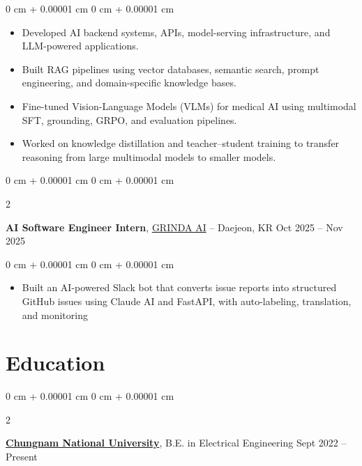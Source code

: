 \documentclass[10pt, letterpaper]{article}
\newenvironment{highlights}{
    \begin{itemize}[
        topsep=0.10 cm,
        parsep=0.10 cm,
        partopsep=0pt,
        itemsep=0pt,
        leftmargin=0 cm + 10pt
    ]
}{
    \end{itemize}
} %
\newenvironment{onecolentry}{
    \begin{adjustwidth}{
        0 cm + 0.00001 cm
    }{
        0 cm + 0.00001 cm
    }
}{
    \end{adjustwidth}
} %
\newenvironment{twocolentry}[2][]{
    \onecolentry
    \def\secondColumn{#2}
    \setcolumnwidth{\fill, 4.5 cm}
    \begin{paracol}{2}
}{
    \switchcolumn \raggedleft \secondColumn
    \end{paracol}
    \endonecolentry
} %
\begin{document}
        \vspace{0.10 cm}
        \begin{onecolentry}
            \begin{highlights}
                \item Developed AI backend systems, APIs, model-serving infrastructure, and LLM-powered applications.
                \item Built RAG pipelines using vector databases, semantic search, prompt engineering, and domain-specific knowledge bases.
                \item Fine-tuned Vision-Language Models (VLMs) for medical AI using multimodal SFT, grounding, GRPO, and evaluation pipelines.
                \item Worked on knowledge distillation and teacher--student training to transfer reasoning from large multimodal models to smaller models.
            \end{highlights}
        \end{onecolentry}
        \vspace{0.20 cm}
        \begin{twocolentry}{
            Oct 2025 – Nov 2025
        }
            \textbf{AI Software Engineer Intern}, \href{https://www.grinda.ai/en}{\textcolor{linkBlue}{GRINDA AI}} -- Daejeon, KR\end{twocolentry}

        \vspace{0.10 cm}
        \begin{onecolentry}
            \begin{highlights}
                \item Built an AI-powered Slack bot that converts issue reports into structured GitHub issues using Claude AI and FastAPI, with auto-labeling, translation, and monitoring
            \end{highlights}
        \end{onecolentry}


    \section{Education}

        \begin{twocolentry}{
            Sept 2022 – Present
        }
            \textbf{\href{https://www.cnu.ac.kr}{\textcolor{linkBlue}{Chungnam National University}}}, B.E. in Electrical Engineering\end{twocolentry}
\end{document}
